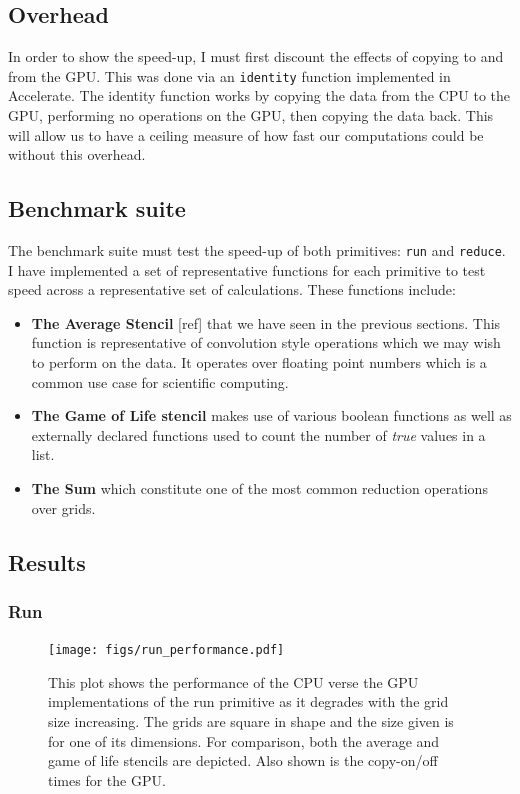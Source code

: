 \documentclass[12pt,a4paper,oneside]{scrbook}
\begin{document}
\subsection{Overhead}

In order to show the speed-up, I must first discount the effects of copying to
and from the GPU. This was done via an \texttt{identity} function implemented in
Accelerate. The identity function works by copying the data from the CPU to the
GPU, performing no operations on the GPU, then copying the data back. This will
allow us to have a ceiling measure of how fast our computations could be
without this overhead.

\subsection{Benchmark suite}

The benchmark suite must test the speed-up of both primitives: \texttt{run} and
\texttt{reduce}. I have implemented a set of representative functions for each
primitive to test speed across a representative set of calculations. These
functions include:

\begin{itemize}
\itemsep1pt\parskip0pt
\item
  \textbf{The Average Stencil} {[}ref{]} that we have seen in the
  previous sections. This function is representative of convolution
  style operations which we may wish to perform on the data. It operates
  over floating point numbers which is a common use case for scientific
  computing.
\item
  \textbf{The Game of Life stencil} makes use of various boolean
  functions as well as externally declared functions used to count the
  number of \emph{true} values in a list.
\item
  \textbf{The Sum} which constitute one of the most common reduction
  operations over grids.
\end{itemize}

\subsection{Results}

\subsubsection{Run}

\begin{figure}[h]
  \texttt{[image: figs/run\_performance.pdf]}
  \caption{This plot shows the performance of the CPU verse the GPU
    implementations of the run primitive as it degrades with the grid size
    increasing. The grids are square in shape and the size given is for one of
    its dimensions. For comparison, both the average and game of life stencils
    are depicted. Also shown is the copy-on/off times for the GPU.}
  \label{fig:runperf100}
\end{figure}
\end{document}
